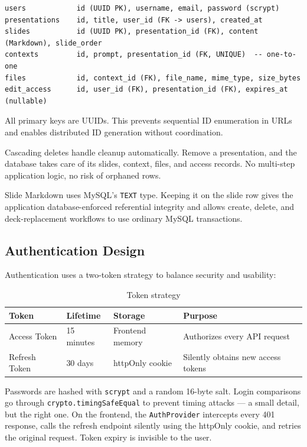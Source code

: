 \documentclass[10pt,a4paper]{article}
\begin{document}
\begin{lstlisting}[language={}, title={MySQL schema (abbreviated)}]
users            id (UUID PK), username, email, password (scrypt)
presentations    id, title, user_id (FK -> users), created_at
slides           id (UUID PK), presentation_id (FK), content (Markdown), slide_order
contexts         id, prompt, presentation_id (FK, UNIQUE)  -- one-to-one
files            id, context_id (FK), file_name, mime_type, size_bytes
edit_access      id, user_id (FK), presentation_id (FK), expires_at (nullable)
\end{lstlisting}

All primary keys are UUIDs. This prevents sequential ID enumeration in URLs and enables distributed ID generation without coordination.

Cascading deletes handle cleanup automatically. Remove a presentation, and the database takes care of its slides, context, files, and access records. No multi-step application logic, no risk of orphaned rows.

Slide Markdown uses MySQL's \texttt{TEXT} type. Keeping it on the slide row gives
the application database-enforced referential integrity and allows create,
delete, and deck-replacement workflows to use ordinary MySQL transactions.

\subsection{Authentication Design}

Authentication uses a two-token strategy to balance security and usability:

\begin{table}[h!]
\centering\small
\renewcommand{\arraystretch}{1.2}
\begin{tabularx}{\linewidth}{@{} l l l X @{}}
\toprule
\textbf{Token} & \textbf{Lifetime} & \textbf{Storage} & \textbf{Purpose} \\
\midrule
Access Token   & 15 minutes & Frontend memory      & Authorizes every API request \\
Refresh Token  & 30 days    & httpOnly cookie      & Silently obtains new access tokens \\
\bottomrule
\end{tabularx}
\vspace{-0.5em}\caption{Token strategy}
\end{table}

Passwords are hashed with \texttt{scrypt} and a random 16-byte salt. Login comparisons go through \texttt{crypto.}\allowbreak\texttt{timingSafeEqual} to prevent timing attacks --- a small detail, but the right one. On the frontend, the \texttt{Auth}\allowbreak\texttt{Provider} intercepts every 401 response, calls the refresh endpoint silently using the httpOnly cookie, and retries the original request. Token expiry is invisible to the user.
\end{document}
